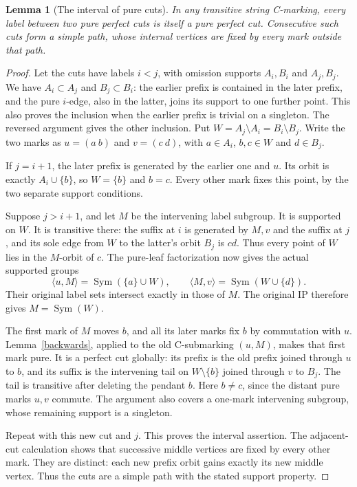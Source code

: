 \documentclass[11pt,a4paper]{article}
\newtheorem{lemma}{Lemma}\newtheorem{theorem}[lemma]{Theorem}
\newcommand{\gen}[1]{\langle#1\rangle}
\newcommand{\Sym}{\operatorname{Sym}}
\begin{document}
\begin{lemma}[The interval of pure cuts]\label{interval}
In any transitive string C-marking, every label between two pure
perfect cuts is itself a pure perfect cut. Consecutive such cuts
form a simple path, whose internal vertices are fixed by every
mark outside that path.
\end{lemma}
\begin{proof}
Let the cuts have labels $i<j$, with omission supports $A_i,B_i$
and $A_j,B_j$. We have $A_i\subset A_j$ and $B_j\subset B_i$:
the earlier prefix is contained in the later prefix, and the pure
$i$-edge, also in the latter, joins its support to one further point.
This also proves the inclusion when the earlier prefix is trivial
on a singleton. The reversed argument gives the other inclusion.
Put $W=A_j\setminus A_i=B_i\setminus B_j$. Write the two marks
as $u=(a\ b)$ and $v=(c\ d)$, with $a\in A_i$, $b,c\in W$
and $d\in B_j$.

If $j=i+1$, the later prefix is generated by the earlier one and
$u$. Its orbit is exactly $A_i\cup\{b\}$, so $W=\{b\}$ and
$b=c$. Every other mark fixes this point, by the two separate
support conditions.

Suppose $j>i+1$, and let $M$ be the intervening label subgroup.
It is supported on $W$. It is transitive there: the suffix at $i$
is generated by $M,v$ and the suffix at $j$, and its sole edge
from $W$ to the latter's orbit $B_j$ is $cd$. Thus every point
of $W$ lies in the $M$-orbit of $c$. The pure-leaf factorization
now gives the actual supported groups
\[
 \gen{u,M}=\Sym(\{a\}\cup W),\qquad
 \gen{M,v}=\Sym(W\cup\{d\}).
\]
Their original label sets intersect exactly in those of $M$.
The original IP therefore gives $M=\Sym(W)$.

The first mark of $M$ moves $b$, and all its later marks fix $b$
by commutation with $u$. Lemma~\ref{backwards}, applied to the old
C-submarking $(u,M)$, makes that first mark pure. It is a perfect
cut globally: its prefix is the old prefix joined through $u$ to
$b$, and its suffix is the intervening tail on $W\setminus\{b\}$
joined through $v$ to $B_j$. The tail is transitive after deleting
the pendant $b$. Here $b\ne c$, since the distant pure marks
$u,v$ commute. The argument also covers a one-mark intervening
subgroup, whose remaining support is a singleton.

Repeat with this new cut and $j$. This proves the interval assertion.
The adjacent-cut calculation shows that successive middle vertices
are fixed by every other mark. They are distinct: each new prefix
orbit gains exactly its new middle vertex. Thus the cuts are a
simple path with the stated support property.
\end{proof}
\end{document}
